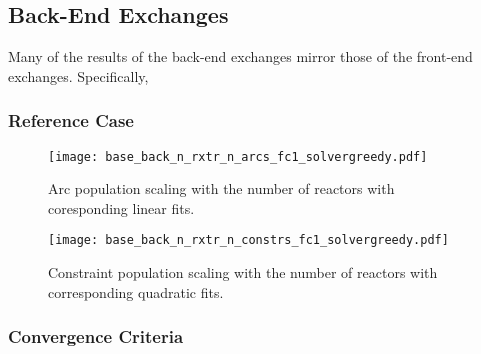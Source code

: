 \subsection{Back-End Exchanges}

Many of the results of the back-end exchanges mirror those of the front-end
exchanges. Specifically, 

\subsubsection{Reference Case}



\begin{figure}[h!]
  \begin{center}
    \texttt{[image: base\_back\_n\_rxtr\_n\_arcs\_fc1\_solvergreedy.pdf]}
    \caption[]{
      \label{fig:base_back_n_rxtr_n_arcs_fc1_solvergreedy}
      Arc population scaling with the number of reactors with coresponding linear fits.}
  \end{center}
\end{figure}

\begin{figure}[h!]
  \begin{center}
    \texttt{[image: base\_back\_n\_rxtr\_n\_constrs\_fc1\_solvergreedy.pdf]}
    \caption[]{
      \label{fig:base_back_n_rxtr_n_constrs_fc1_solvergreedy}
      Constraint population scaling with the number of reactors with
      corresponding quadratic fits.}
  \end{center}
\end{figure}





\subsubsection{Convergence Criteria}
